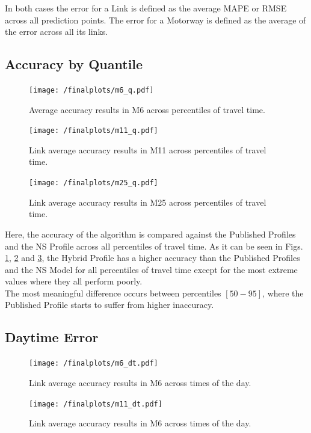 \documentclass[conference, letterpaper]{IEEEtran}
\begin{document}
In both cases the error for a Link is defined as the average MAPE or RMSE across all prediction points.
The error for a Motorway is defined as the average of the error across all its links.
\subsection{Accuracy by Quantile}
\begin{figure}[htbp]
	\centerline{\texttt{[image: /finalplots/m6\_q.pdf]}}
	\caption{Average accuracy results in M6 across percentiles of travel time.}
	\label{fig:m6q}
\end{figure}

\begin{figure}[htbp]
	\centering
	\texttt{[image: /finalplots/m11\_q.pdf]}
	\caption{Link average accuracy results in M11 across percentiles of travel time.}
	\label{fig:m11q}
\end{figure}

\begin{figure}[htbp]
	\centering
	\texttt{[image: /finalplots/m25\_q.pdf]}
	\caption{Link average accuracy results in M25 across percentiles of travel time.}
	\label{fig:m25q}
\end{figure}
Here, the accuracy of the algorithm is compared against the Published Profiles and the NS Profile across all percentiles of travel time.
As it can be seen in Figs. \ref{fig:m6q}, \ref{fig:m11q} and \ref{fig:m25q}, the Hybrid Profile has a higher accuracy than the Published Profiles and the NS Model for all percentiles of travel time except for the most extreme values where they all perform poorly.\\
The most meaningful difference occurs between percentiles $[50-95]$, where the Published Profile starts to suffer from higher inaccuracy.

\subsection{Daytime Error}
\begin{figure}[htbp]
	\centering
		\texttt{[image: /finalplots/m6\_dt.pdf]}
	\caption{Link average accuracy results in M6 across times of the day.}
	\label{fig:m6daytime}
\end{figure}

\begin{figure}[htbp]
	\centering
	\texttt{[image: /finalplots/m11\_dt.pdf]}
	\caption{Link average accuracy results in M6 across times of the day.}
	\label{fig:m11daytime}
\end{figure}
\end{document}
